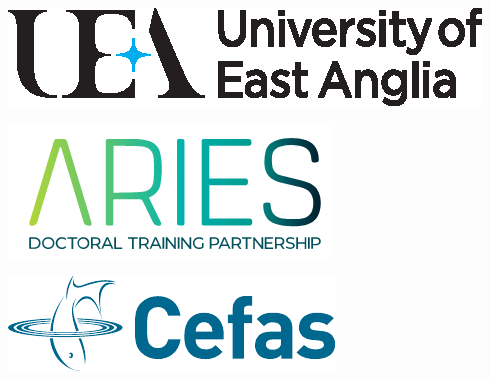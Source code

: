 \documentclass[paper=a4]{scrartcl}
\begin{document}
\begin{center}
\begin{minipage}{0.2\linewidth}
    \includegraphics[width=\linewidth]{uealogo_horizontal.eps}
\end{minipage}
\hspace{2cm}
\begin{minipage}{0.2\linewidth}
    \includegraphics[width=\linewidth]{aries_logo.png}
\end{minipage}
\hspace{2cm}
\begin{minipage}{0.2\linewidth}
    \includegraphics[width=\linewidth]{cefas_logo.pdf}
\end{minipage}
\end{center}
\end{document}
